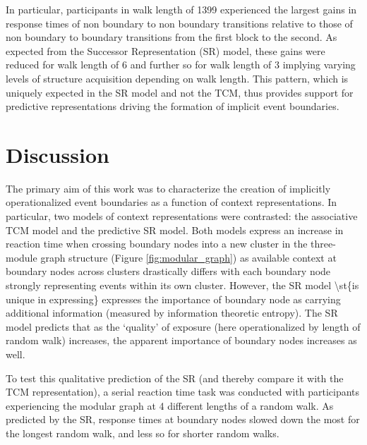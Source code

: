 In particular, participants in walk length of 1399 experienced the largest gains in response times of non boundary to non boundary transitions relative to those of non boundary to boundary transitions from the first block to the second. As expected from the Successor Representation (SR) model, these gains were reduced for walk length of 6 and further so for walk length of 3 implying varying levels of structure acquisition depending on walk length. This pattern, which is uniquely expected in the SR model and not the TCM, thus provides support for predictive representations driving the formation of implicit event boundaries. 

\section{Discussion}

The primary aim of this work was to characterize the creation of implicitly operationalized event boundaries as a function of context representations. In particular, two models of context representations were contrasted: the associative TCM model and the predictive SR model. Both models express an increase in reaction time when crossing boundary nodes into a new cluster in the three-module graph structure (Figure \ref{fig:modular_graph}) as available context at boundary nodes across clusters drastically differs with each boundary node strongly representing events within its own cluster. However, the SR model \ac{\st{is unique in expressing} expresses} the importance of boundary node as carrying additional information (measured by information theoretic entropy). The SR model predicts that as the `quality' of exposure (here operationalized by length of random walk) increases, the apparent importance of boundary nodes increases as well. 

To test this qualitative prediction of the SR (and thereby compare it with the TCM representation), a serial reaction time task was conducted with participants experiencing the modular graph at 4 different lengths of a random walk. As predicted by the SR, response times at boundary nodes slowed down the most for the longest random walk, and less so for shorter random walks. 

